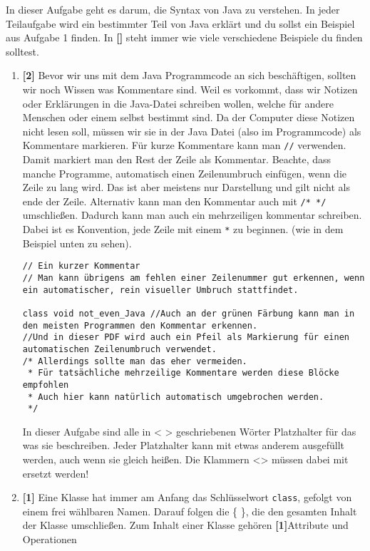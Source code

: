 
In dieser Aufgabe geht es darum, die Syntax von Java zu verstehen.
In jeder Teilaufgabe wird ein bestimmter Teil von Java erklärt und du sollst ein Beispiel aus Aufgabe 1 finden. In \textbf{[]} steht immer wie viele verschiedene Beispiele du finden solltest.

\begin{enumerate}
    \item \textbf{[2]} Bevor wir uns mit dem Java Programmcode an sich beschäftigen, sollten wir noch Wissen was Kommentare sind.
    Weil es vorkommt, dass wir Notizen oder Erklärungen in die Java-Datei schreiben wollen, welche für andere Menschen oder einem selbst bestimmt sind. Da der Computer diese Notizen nicht lesen soll, müssen wir sie in der Java Datei (also im Programmcode) als Kommentare markieren.
          Für kurze Kommentare kann man \lstinline[breaklines=false]{//} verwenden. Damit markiert man den Rest der Zeile als Kommentar. Beachte, dass manche Programme, automatisch einen Zeilenumbruch einfügen, wenn die Zeile zu lang wird.
          Das ist aber meistens nur Darstellung und gilt nicht als ende der Zeile.
          Alternativ kann man den Kommentar auch mit \lstinline[breaklines=false]{/* */} umschließen. Dadurch kann man auch ein mehrzeiligen kommentar schreiben. Dabei ist es Konvention, jede Zeile mit einem \textcolor{javagreen}{\texttt{*}} zu beginnen. (wie in dem Beispiel unten zu sehen).
          \begin{lstlisting}[title=\textbf{Kommentar Beispiel}]
// Ein kurzer Kommentar 
// Man kann übrigens am fehlen einer Zeilenummer gut erkennen, wenn ein automatischer, rein visueller Umbruch stattfindet.
    
class void not_even_Java //Auch an der grünen Färbung kann man in den meisten Programmen den Kommentar erkennen.
//Und in dieser PDF wird auch ein Pfeil als Markierung für einen automatischen Zeilenumbruch verwendet.
/* Allerdings sollte man das eher vermeiden.
 * Für tatsächliche mehrzeilige Kommentare werden diese Blöcke empfohlen
 * Auch hier kann natürlich automatisch umgebrochen werden.
 */
        \end{lstlisting}
        In dieser Aufgabe sind alle in < > geschriebenen Wörter Platzhalter für das was sie beschreiben. Jeder Platzhalter kann mit etwas anderem ausgefüllt werden, auch wenn sie gleich heißen. Die Klammern <> müssen dabei mit ersetzt werden!
    \item \textbf{[1]} Eine Klasse hat immer am Anfang das Schlüsselwort \lstinline{class}, gefolgt von einem frei wählbaren Namen. Darauf folgen die \{ \}, die den gesamten Inhalt der Klasse umschließen.
          Zum Inhalt einer Klasse gehören \textbf{[1]}Attribute und Operationen


\end{enumerate}
